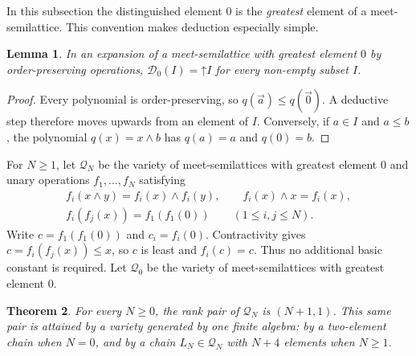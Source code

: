 \documentclass[12pt,english]{amsart}
\newtheorem{theorem}{Theorem}[section]
\newtheorem{lemma}[theorem]{Lemma}
\theoremstyle{definition}
\numberwithin{equation}{section}
\theoremstyle{remark}
\begin{document}
In this subsection the distinguished element $0$ is the \emph{greatest}
element of a meet-semilattice. This convention makes deduction especially
simple.

\begin{lemma}\label{LemMeetDeductiveClosure}
In an expansion of a meet-semilattice with greatest element $0$ by
order-preserving operations, $\mathcal D_0(I)=\mathord\uparrow I$ for every
non-empty subset $I$.
\end{lemma}

\begin{proof}
Every polynomial is order-preserving, so
$q(\vec a)\leqslant q(\vec0)$. A deductive step therefore moves upwards
from an element of $I$. Conversely, if $a\in I$ and $a\leqslant b$, the
polynomial $q(x)=x\wedge b$ has $q(a)=a$ and $q(0)=b$.
\end{proof}

For $N\geqslant1$, let $\mathcal Q_N$ be the variety of meet-semilattices
with greatest element $0$ and unary operations $f_1,\ldots,f_N$ satisfying
\begin{equation}\label{EqAnnihilatingSpectrumAxioms}
\begin{gathered}
f_i(x\wedge y)=f_i(x)\wedge f_i(y),\qquad
f_i(x)\wedge x=f_i(x),\\
f_i(f_j(x))=f_1(f_1(0))\qquad(1\leqslant i,j\leqslant N).
\end{gathered}
\end{equation}
Write $c=f_1(f_1(0))$ and $c_i=f_i(0)$. Contractivity gives
$c=f_i(f_j(x))\leqslant x$, so $c$ is least and $f_i(c)=c$.
Thus no additional basic constant is required. Let $\mathcal Q_0$ be the
variety of meet-semilattices with greatest element $0$.

\begin{theorem}\label{ThmAnnihilatingSpectrum}
For every $N\geqslant0$, the rank pair of $\mathcal Q_N$ is $(N+1,1)$.
This same pair is attained by a variety generated by one finite algebra:
by a two-element chain when $N=0$, and by a chain $L_N\in\mathcal Q_N$
with $N+4$ elements when $N\geqslant1$.
\end{theorem}
\end{document}
